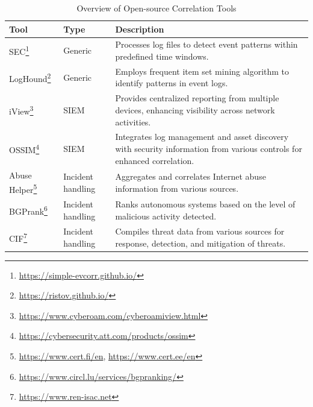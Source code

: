 \begin{table}[h]
    \centering
    \caption{Overview of Open-source Correlation Tools \cite{skopik_problem_2016}}
    \label{tab:correlation_tools}
    \begin{minipage}{\textwidth}
        \begin{tabular}{l l p{}}
            \hline
            \textbf{Tool} & \textbf{Type} & \textbf{Description} \\
            \hline
            SEC\footnote{\url{https://simple-evcorr.github.io/}} & Generic & Processes log files to detect event patterns within predefined time windows. \\
            LogHound\footnote{\url{https://ristov.github.io/}} & Generic & Employs frequent item set mining algorithm to identify patterns in event logs. \\
            iView\footnote{\url{https://www.cyberoam.com/cyberoamiview.html}} & SIEM & Provides centralized reporting from multiple devices, enhancing visibility across network activities. \\
            OSSIM\footnote{\url{https://cybersecurity.att.com/products/ossim}} & SIEM & Integrates log management and asset discovery with security information from various controls for enhanced correlation. \\

            Abuse Helper\footnote{\url{https://www.cert.fi/en}, \url{https://www.cert.ee/en}} & Incident handling & Aggregates and correlates Internet abuse information from various sources. \\
            BGPrank\footnote{\url{https://www.circl.lu/services/bgpranking/}} & Incident handling & Ranks autonomous systems based on the level of malicious activity detected. \\
            CIF\footnote{\url{https://www.ren-isac.net}} & Incident handling & Compiles threat data from various sources for response, detection, and mitigation of threats. \\
        \end{tabular}
    \end{minipage}
\end{table}




